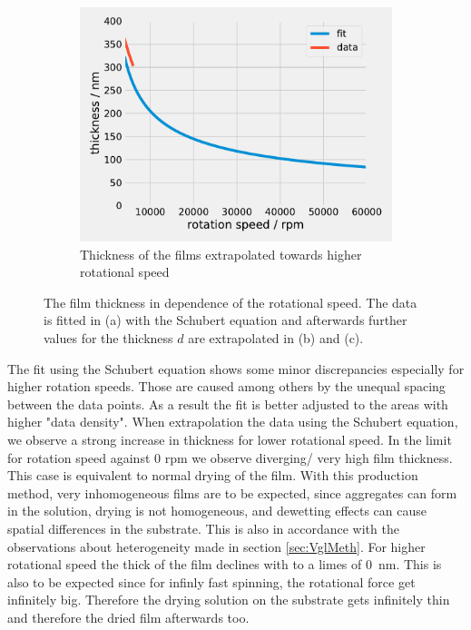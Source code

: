 \begin{figure}[ht]
    \begin{subfigure}[b]{0.5\textwidth}
        \centering
        \includegraphics[width = \textwidth]{Programmien/RotFit5000to10000.pdf}
        \caption{Thickness of the films extrapolated towards higher rotational speed}
    \end{subfigure}  

    \caption{The film thickness in dependence of the rotational speed. The data is fitted in (a) with the Schubert equation and afterwards further values for the thickness $d$ are extrapolated in (b) and (c).}
\end{figure}


The fit using the Schubert equation shows some minor discrepancies especially for higher rotation speeds. Those are caused among others by the unequal spacing between the data points.
As a result the fit is better adjusted to the areas with higher "data density". When extrapolation the data using the Schubert equation, we observe a strong increase in thickness for lower rotational speed.
In the limit for rotation speed against 0 rpm we observe diverging/ very high film thickness. This case is equivalent to normal drying of the film. With this production method, very inhomogeneous films are to be expected, since aggregates can form in the solution, drying is not homogeneous, and dewetting effects can cause spatial differences in the substrate.
This is also in accordance with the observations about heterogeneity made in section \ref{sec:VglMeth}. For higher rotational speed the thick of the film declines with to a limes of \SI{0}{nm}. This is also to be expected since for infinly fast spinning, the
rotational force get infinitely big. Therefore the drying solution on the substrate gets infinitely thin and therefore the dried film afterwards too.


